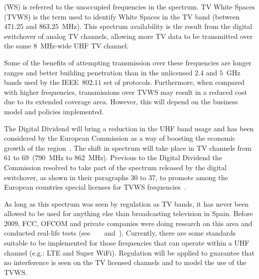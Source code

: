  (WS) is referred to the unoccupied frequencies in the spectrum. TV White Spaces (TVWS) is the term used to identify White Spaces in the TV band (between $471.25$ and $863.25$~MHz). This spectrum availability is the result from the digital switchover of analog TV channels, allowing more TV data to be transmitted over the same $8$~MHz-wide UHF TV channel.

Some of the benefits of attempting transmission over these frequencies are longer ranges and better building penetration than in the unlicensed $2.4$ and $5$~GHz bands used by the IEEE~$802.11$ set of protocols. Furthermore, when compared with higher frequencies, transmissions over TVWS may result in a reduced cost due to its extended coverage area. However, this will depend on the business model and policies implemented.

The Digital Dividend will bring a reduction in the UHF band usage and has been considered by the European Commission as a way of boosting the economic growth of the region~\cite{digitalDividend}. The shift in spectrum will take place in TV channels from $61$ to $69$~($790$~MHz to $862$~MHz). Previous to the Digital Dividend the Commission resolved to take part of the spectrum released by the digital switchover, as shown in their paragraphs 30 to 37, to promote among the European countries special licenses for TVWS frequencies~\cite{spectrumShift}.

% 

As long as this spectrum was seen by regulation as TV bands, it has never been allowed to be used for anything else than broadcasting television in Spain. Before $2009$, FCC, OFCOM and private companies were doing research on this area and conducted real-life tests (see~\cite{chandra2011campus}~\cite{davies2011field}~\cite{dvbtSensing}~and~\cite{digitalDividendCognitiveAccess}). Currently, there are some standards suitable to be implemented for those frequencies that can operate within a UHF channel (e.g.: LTE and Super WiFi). Regulation will be applied to guarantee that no interference is seen on the TV licensed channels and to model the use of the TVWS.


